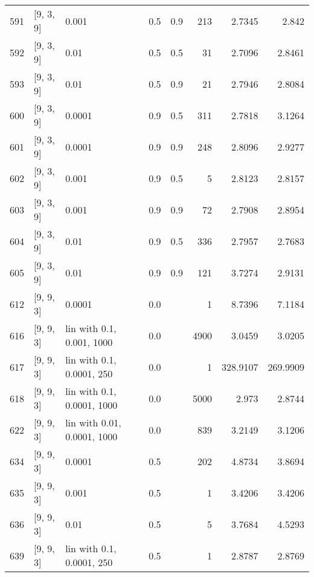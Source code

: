 \begin{longtable}{lllrrrrr}
  591 &          [9, 3, 9] &                       0.001 &      0.5 & 0.9 &  213 &   2.7345 &    2.842 \\
  592 &          [9, 3, 9] &                        0.01 &      0.5 & 0.5 &   31 &   2.7096 &   2.8461 \\
  593 &          [9, 3, 9] &                        0.01 &      0.5 & 0.9 &   21 &   2.7946 &   2.8084 \\
  600 &          [9, 3, 9] &                      0.0001 &      0.9 & 0.5 &  311 &   2.7818 &   3.1264 \\
  601 &          [9, 3, 9] &                      0.0001 &      0.9 & 0.9 &  248 &   2.8096 &   2.9277 \\
  602 &          [9, 3, 9] &                       0.001 &      0.9 & 0.5 &    5 &   2.8123 &   2.8157 \\
  603 &          [9, 3, 9] &                       0.001 &      0.9 & 0.9 &   72 &   2.7908 &   2.8954 \\
  604 &          [9, 3, 9] &                        0.01 &      0.9 & 0.5 &  336 &   2.7957 &   2.7683 \\
  605 &          [9, 3, 9] &                        0.01 &      0.9 & 0.9 &  121 &   3.7274 &   2.9131 \\
  612 &          [9, 9, 3] &                      0.0001 &      0.0 &     &    1 &   8.7396 &   7.1184 \\
  616 &          [9, 9, 3] &   lin with 0.1, 0.001, 1000 &      0.0 &     & 4900 &   3.0459 &   3.0205 \\
  617 &          [9, 9, 3] &   lin with 0.1, 0.0001, 250 &      0.0 &     &    1 & 328.9107 & 269.9909 \\
  618 &          [9, 9, 3] &  lin with 0.1, 0.0001, 1000 &      0.0 &     & 5000 &    2.973 &   2.8744 \\
  622 &          [9, 9, 3] & lin with 0.01, 0.0001, 1000 &      0.0 &     &  839 &   3.2149 &   3.1206 \\
  634 &          [9, 9, 3] &                      0.0001 &      0.5 &     &  202 &   4.8734 &   3.8694 \\
  635 &          [9, 9, 3] &                       0.001 &      0.5 &     &    1 &   3.4206 &   3.4206 \\
  636 &          [9, 9, 3] &                        0.01 &      0.5 &     &    5 &   3.7684 &   4.5293 \\
  639 &          [9, 9, 3] &   lin with 0.1, 0.0001, 250 &      0.5 &     &    1 &   2.8787 &   2.8769 \\

\end{longtable}
